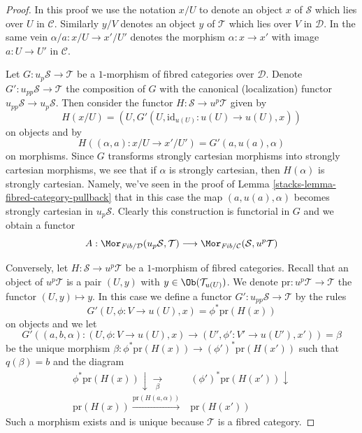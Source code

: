 \begin{proof}

In this proof we use the notation $x/U$ to denote an object
$x$ of $\mathcal{S}$ which lies over $U$ in $\mathcal{C}$.
Similarly $y/V$ denotes an object $y$ of $\mathcal{T}$
which lies over $V$ in $\mathcal{D}$. In the same vein
$\alpha/a : x/U \to x'/U'$ denotes the morphism
$\alpha : x \to x'$ with image $a : U \to U'$ in $\mathcal{C}$.

\medskip\noindent
Let $G : u_p\mathcal{S} \to \mathcal{T}$ be a $1$-morphism of fibred
categories over $\mathcal{D}$. Denote $G' : u_{pp}\mathcal{S} \to \mathcal{T}$
the composition of $G$ with the canonical (localization) functor
$u_{pp}\mathcal{S} \to u_p\mathcal{S}$. Then consider the functor
$H : \mathcal{S} \to u^p\mathcal{T}$ given by
$$
H(x/U) = (U, G'(U, \text{id}_{u(U)} : u(U) \to u(U), x))
$$
on objects and by
$$
H((\alpha, a) : x/U \to x'/U') = G'(a, u(a), \alpha)
$$
on morphisms. Since $G$ transforms strongly cartesian morphisms
into strongly cartesian morphisms, we see that if $\alpha$ is strongly
cartesian, then $H(\alpha)$ is strongly cartesian.
Namely, we've seen in the proof of
Lemma \ref{stacks-lemma-fibred-category-pullback}
that in this case the map $(a, u(a), \alpha)$ becomes
strongly cartesian in $u_p\mathcal{S}$. Clearly this construction is
functorial in $G$ and we obtain a functor
$$
A :
\Mor_{\textit{Fib}/\mathcal{D}}(u_p\mathcal{S}, \mathcal{T})
\longrightarrow
\Mor_{\textit{Fib}/\mathcal{C}}(\mathcal{S}, u^p\mathcal{T})
$$

\medskip\noindent
Conversely, let $H : \mathcal{S} \to u^p\mathcal{T}$ be a $1$-morphism
of fibred categories. Recall that an object of $u^p\mathcal{T}$ is
a pair $(U, y)$ with $y \in \Ob(\mathcal{T}_{u(U)})$. We denote
$\text{pr} : u^p\mathcal{T} \to \mathcal{T}$ the functor $(U, y) \mapsto y$.
In this case we define a functor
$G' : u_{pp}\mathcal{S} \to \mathcal{T}$ by the rules
$$
G'(U, \phi : V \to u(U), x) = \phi^*\text{pr}(H(x))
$$
on objects and we let
$$
G'((a, b, \alpha) : (U, \phi : V \to u(U), x)
\to (U', \phi' : V' \to u(U'), x'))
=
\beta
$$
be the unique morphism
$\beta : \phi^*\text{pr}(H(x)) \to (\phi')^*\text{pr}(H(x'))$
such that $q(\beta) = b$ and the diagram
$$
\begin{array}{cc}\phi^*\text{pr}(H(x)) \downarrow\underset{\beta}{\longrightarrow} & (\phi')^*\text{pr}(H(x')) \downarrow \\ \text{pr}(H(x)) \overset{\text{pr}(H(a, \alpha))}{\longrightarrow} & \text{pr}(H(x'))\end{array}
$$
Such a morphism exists and is unique because $\mathcal{T}$ is a fibred
category.


\end{proof}
